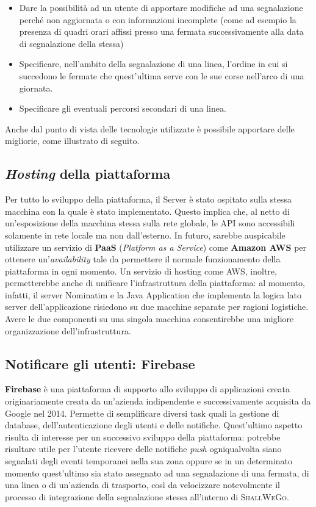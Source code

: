 		\begin{itemize}
			\item Dare la possibilità ad un utente di apportare modifiche ad una segnalazione perché non aggiornata o con informazioni incomplete (come ad esempio la presenza di quadri orari affissi presso una fermata successivamente alla data di segnalazione della stessa)
			\item Specificare, nell'ambito della segnalazione di una linea, l'ordine in cui si succedono le fermate che quest'ultima serve con le sue corse nell'arco di una giornata.
			\item Specificare gli eventuali percorsi secondari di una linea. 
		\end{itemize}

		Anche dal punto di vista delle tecnologie utilizzate è possibile apportare delle migliorie, come illustrato di seguito. 

		\subsection{\textit{Hosting} della piattaforma}
			Per tutto lo sviluppo della piattaforma, il Server è stato ospitato sulla stessa macchina con la quale è stato implementato. Questo implica che, al netto di un'esposizione della macchina stessa sulla rete globale, le API sono accessibili solamente in rete locale ma non dall'esterno. In futuro, sarebbe auspicabile utilizzare un servizio di \textbf{PaaS} (\textit{Platform as a Service}) come \textbf{Amazon AWS} per ottenere un'\textit{availability} tale da permettere il normale funzionamento della piattaforma in ogni momento. Un servizio di hosting come AWS, inoltre, permetterebbe anche di unificare l'infrastruttura della piattaforma: al momento, infatti, il server Nominatim e la Java Application che implementa la logica lato server dell'applicazione risiedono su due macchine separate per ragioni logistiche. Avere le due componenti su una singola macchina consentirebbe una migliore organizzazione dell'infrastruttura.

		\subsection{Notificare gli utenti: Firebase}
			\textbf{Firebase} è una piattaforma di supporto allo sviluppo di applicazioni creata originariamente creata da un'azienda indipendente e successivamente acquisita da Google nel 2014. Permette di semplificare diversi task quali la gestione di database, dell'autenticazione degli utenti e delle notifiche. Quest'ultimo aspetto risulta di interesse per un successivo sviluppo della piattaforma: potrebbe risultare utile per l'utente ricevere delle notifiche \textit{push} ogniqualvolta siano segnalati degli eventi temporanei nella sua zona oppure se in un determinato momento quest'ultimo sia stato assegnato ad una segnalazione di una fermata, di una linea o di un'azienda di trasporto, così da velocizzare notevolmente il processo di integrazione della segnalazione stessa all'interno di \textsc{ShallWeGo}. 

		
